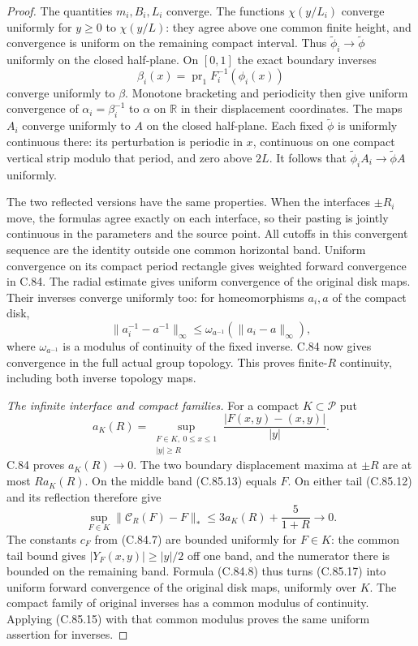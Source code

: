 \begin{proof}
The quantities $m_i,B_i,L_i$ converge.
The functions $\chi(y/L_i)$ converge
uniformly for $y\geq0$ to $\chi(y/L)$:
they agree above one common finite
height, and convergence is uniform on
the remaining compact interval.
Thus $\widetilde\phi_i\to\widetilde\phi$
uniformly on the closed half-plane.
On $[0,1]$ the exact boundary inverses
\[
       \beta_i(x)=\operatorname{pr}_1
                    F_i^{-1}(\phi_i(x))                          \tag{C.85.14}
\]
converge uniformly to $\beta$.
Monotone bracketing and periodicity then
give uniform convergence of
$\alpha_i=\beta_i^{-1}$ to $\alpha$
on $\mathbb R$ in their displacement
coordinates. The maps $A_i$ converge
uniformly to $A$ on the closed
half-plane. Each fixed
$\widetilde\phi$ is uniformly continuous
there: its perturbation is periodic
in $x$, continuous on one compact
vertical strip modulo that period,
and zero above $2L$.
It follows that
$\widetilde\phi_i A_i\to\widetilde\phi A$
uniformly.

The two reflected versions have the
same properties. When the interfaces
$\pm R_i$ move, the formulas agree
exactly on each interface, so their
pasting is jointly continuous in the
parameters and the source point.
All cutoffs in this convergent sequence
are the identity outside one common
horizontal band. Uniform convergence
on its compact period rectangle gives
weighted forward convergence in C.84.
The radial estimate gives uniform
convergence of the original disk maps.
Their inverses converge uniformly too:
for homeomorphisms $a_i,a$ of the
compact disk,
\[
 \|a_i^{-1}-a^{-1}\|_\infty
       \leq\omega_{a^{-1}}
                     (\|a_i-a\|_\infty),                        \tag{C.85.15}
\]
where $\omega_{a^{-1}}$ is a modulus
of continuity of the fixed inverse.
C.84 now gives convergence in the
full actual group topology. This
proves finite-$R$ continuity, including
both inverse topology maps.

\emph{The infinite interface and compact families.}
For a compact $K\subset\mathscr P$ put
\[
 a_K(R)=\sup_{\substack{F\in K,\ 0\leq x\leq1\\|y|\geq R}}
                  \frac{|F(x,y)-(x,y)|}{|y|}.
                                                                    \tag{C.85.16}
\]
C.84 proves $a_K(R)\to0$.
The two boundary displacement maxima
at $\pm R$ are at most $Ra_K(R)$.
On the middle band (C.85.13) equals
$F$. On either tail (C.85.12) and its
reflection therefore give
\[
 \sup_{F\in K}\|\mathcal C_R(F)-F\|_*
          \leq 3a_K(R)+\frac{5}{1+R}
                   \longrightarrow0.                            \tag{C.85.17}
\]
The constants $c_F$ from (C.84.7) are
bounded uniformly for $F\in K$:
the common tail bound gives
$|Y_F(x,y)|\geq|y|/2$ off one band,
and the numerator there is bounded
on the remaining band. Formula
(C.84.8) thus turns (C.85.17) into
uniform forward convergence of the
original disk maps, uniformly over
$K$. The compact family of original
inverses has a common modulus of
continuity. Applying (C.85.15) with
that common modulus proves the same
uniform assertion for inverses.


\end{proof}
